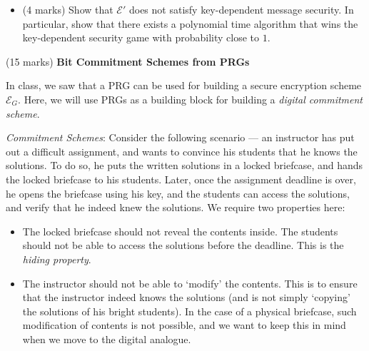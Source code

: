 \documentclass[10pt,addpoints]{exam}
\newcommand{\calE}{\mathcal{E}}
\begin{document}
\begin{questions}
\begin{itemize}
    \item (4 marks) Show that $\calE'$ does not satisfy key-dependent message security. In particular, show that there exists a polynomial time algorithm that wins the key-dependent security game with probability close to $1$. 
\end{itemize}


\vspace{20pt}

\question (15 marks)
\textbf{Bit Commitment Schemes from PRGs}

In class, we saw that a PRG can be used for building a secure encryption scheme $\calE_G$. Here, we will use PRGs as a building block for building a \emph{digital commitment scheme}.


\vspace{5pt}

\emph{Commitment Schemes}: Consider the following scenario --- an instructor has put out a difficult assignment, and wants to convince his students that he knows the solutions. To do so, he puts the written solutions in a locked briefcase, and hands the locked briefcase to his students. Later, once the assignment deadline is over, he opens the briefcase using his key, and the students can access the solutions, and verify that he indeed knew the solutions. We require two properties here: 
\begin{itemize}[noitemsep]
    \item The locked briefcase should not reveal the contents inside. The students should not be able to access the solutions before the deadline. This is the \emph{hiding property}. 
    \item The instructor should not be able to `modify' the contents. This is to ensure that the instructor indeed knows the solutions (and is not simply `copying' the solutions of his bright students). In the case of a physical briefcase, such modification of contents is not possible, and we want to keep this in mind when we move to the digital analogue.
\end{itemize}

\vspace{5pt} 

\newcommand{\commitrec}{\mathsf{Commit\mhyphen Rec}}
\newcommand{\commitsend}{{\mathsf{Commit\mhyphen Send}}}
\newcommand{\rmsg}{\mathsf{r\mhyphen msg}}
\newcommand{\com}{\mathsf{com}}
\newcommand{\op}{\mathsf{op}}
\newcommand{\checkopen}{\mathsf{CheckOpen}}
\newcommand{\bindinggame}{\ensuremath{\mathsf{Binding\mhyphen Game}}}
\newcommand{\hidinggame}{{\ensuremath{\mathsf{Hiding\mhyphen Game}}}}


\end{questions}
\end{document}
